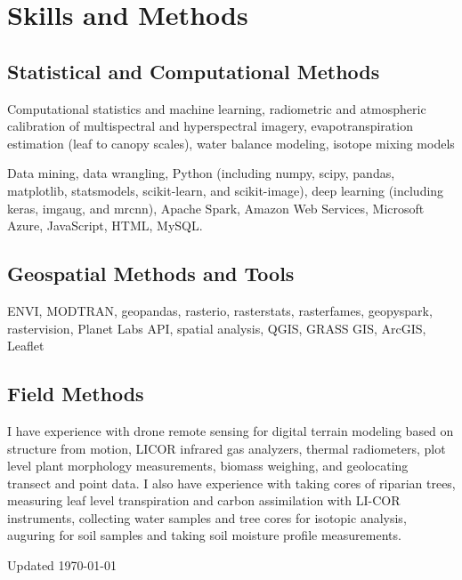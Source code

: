 \documentclass[12pt,letterpaper]{report}
\newcommand{\listitemspace}{0.15em}
\renewenvironment{itemize}
{\begin{list}{}{\setlength{\leftmargin}{0em}
			\setlength{\parskip}{0em}
			\setlength{\itemsep}{\listitemspace}
			\setlength{\parsep}{\listitemspace}}}
	{\end{list}}
\begin{document}
	
	
	\section*{Skills and Methods}
	
	\subsection*{Statistical and Computational Methods}
	
	\begin{itemize}
		
		\item Computational statistics and machine learning, radiometric and atmospheric calibration of multispectral and hyperspectral imagery, evapotranspiration estimation (leaf to canopy scales), water balance modeling, isotope mixing models

                \item Data mining, data wrangling, Python (including numpy, scipy, pandas, matplotlib, statsmodels, scikit-learn, and scikit-image), deep learning (including keras, imgaug, and mrcnn), Apache Spark, Amazon Web Services, Microsoft Azure, JavaScript, HTML, MySQL.
		
	\end{itemize}
	
	\subsection*{Geospatial Methods and Tools}
	
	\begin{itemize}
		
		\item ENVI, MODTRAN, geopandas, rasterio, rasterstats, rasterfames, geopyspark, rastervision, Planet Labs API, spatial analysis, QGIS, GRASS GIS, ArcGIS, Leaflet
		
	\end{itemize}
	
	\subsection*{Field Methods}
	
	\begin{itemize}
		
		\item I have experience with drone remote sensing for digital terrain modeling based on structure from motion, LICOR infrared gas analyzers, thermal radiometers, plot level plant morphology measurements, biomass weighing, and geolocating transect and point data. I also have experience with taking cores of riparian trees, measuring leaf level transpiration and carbon assimilation with LI-COR instruments, collecting water samples and tree cores for isotopic analysis, auguring for soil samples and taking soil moisture profile measurements.
		
	\end{itemize}
	
	
	
	\begin{center}
		\vspace{6em}
		Updated \monthyeardate\today
	\end{center}
	
	
	
\end{document}
